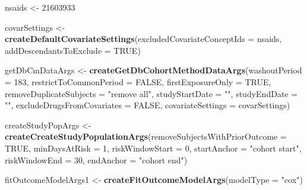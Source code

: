 \documentclass[
]{article}
\newenvironment{Shaded}{\begin{snugshade}}{\end{snugshade}}
\newcommand{\DataTypeTok}[1]{\textcolor[rgb]{0.13,0.29,0.53}{#1}}
\newcommand{\DecValTok}[1]{\textcolor[rgb]{0.00,0.00,0.81}{#1}}
\newcommand{\KeywordTok}[1]{\textcolor[rgb]{0.13,0.29,0.53}{\textbf{#1}}}
\newcommand{\NormalTok}[1]{#1}
\newcommand{\OtherTok}[1]{\textcolor[rgb]{0.56,0.35,0.01}{#1}}
\newcommand{\StringTok}[1]{\textcolor[rgb]{0.31,0.60,0.02}{#1}}
\begin{document}
\begin{Shaded}
\begin{Highlighting}[]
\NormalTok{nsaids <-}\StringTok{ }\DecValTok{21603933}

\NormalTok{covarSettings <-}\StringTok{ }\KeywordTok{createDefaultCovariateSettings}\NormalTok{(}\DataTypeTok{excludedCovariateConceptIds =}\NormalTok{ nsaids,}
                                                \DataTypeTok{addDescendantsToExclude =} \OtherTok{TRUE}\NormalTok{)}

\NormalTok{getDbCmDataArgs <-}\StringTok{ }\KeywordTok{createGetDbCohortMethodDataArgs}\NormalTok{(}\DataTypeTok{washoutPeriod =} \DecValTok{183}\NormalTok{,}
                                                   \DataTypeTok{restrictToCommonPeriod =} \OtherTok{FALSE}\NormalTok{,}
                                                   \DataTypeTok{firstExposureOnly =} \OtherTok{TRUE}\NormalTok{,}
                                                   \DataTypeTok{removeDuplicateSubjects =} \StringTok{"remove all"}\NormalTok{,}
                                                   \DataTypeTok{studyStartDate =} \StringTok{""}\NormalTok{,}
                                                   \DataTypeTok{studyEndDate =} \StringTok{""}\NormalTok{,}
                                                   \DataTypeTok{excludeDrugsFromCovariates =} \OtherTok{FALSE}\NormalTok{,}
                                                   \DataTypeTok{covariateSettings =}\NormalTok{ covarSettings)}

\NormalTok{createStudyPopArgs <-}\StringTok{ }\KeywordTok{createCreateStudyPopulationArgs}\NormalTok{(}\DataTypeTok{removeSubjectsWithPriorOutcome =} \OtherTok{TRUE}\NormalTok{,}
                                                      \DataTypeTok{minDaysAtRisk =} \DecValTok{1}\NormalTok{,}
                                                      \DataTypeTok{riskWindowStart =} \DecValTok{0}\NormalTok{,}
                                                      \DataTypeTok{startAnchor =} \StringTok{"cohort start"}\NormalTok{,}
                                                      \DataTypeTok{riskWindowEnd =} \DecValTok{30}\NormalTok{,}
                                                      \DataTypeTok{endAnchor =} \StringTok{"cohort end"}\NormalTok{)}

\NormalTok{fitOutcomeModelArgs1 <-}\StringTok{ }\KeywordTok{createFitOutcomeModelArgs}\NormalTok{(}\DataTypeTok{modelType =} \StringTok{"cox"}\NormalTok{)}
\end{Highlighting}
\end{Shaded}
\end{document}
